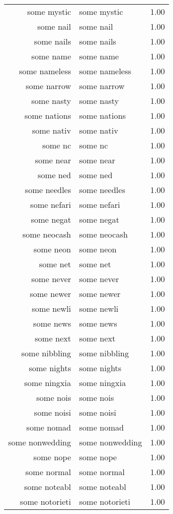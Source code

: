 \begin{table}[ht]
\begin{tabular}{rlr}
  some mystic & some mystic & 1.00 \\ 
  some nail & some nail & 1.00 \\ 
  some nails & some nails & 1.00 \\ 
  some name & some name & 1.00 \\ 
  some nameless & some nameless & 1.00 \\ 
  some narrow & some narrow & 1.00 \\ 
  some nasty & some nasty & 1.00 \\ 
  some nations & some nations & 1.00 \\ 
  some nativ & some nativ & 1.00 \\ 
  some nc & some nc & 1.00 \\ 
  some near & some near & 1.00 \\ 
  some ned & some ned & 1.00 \\ 
  some needles & some needles & 1.00 \\ 
  some nefari & some nefari & 1.00 \\ 
  some negat & some negat & 1.00 \\ 
  some neocash & some neocash & 1.00 \\ 
  some neon & some neon & 1.00 \\ 
  some net & some net & 1.00 \\ 
  some never & some never & 1.00 \\ 
  some newer & some newer & 1.00 \\ 
  some newli & some newli & 1.00 \\ 
  some news & some news & 1.00 \\ 
  some next & some next & 1.00 \\ 
  some nibbling & some nibbling & 1.00 \\ 
  some nights & some nights & 1.00 \\ 
  some ningxia & some ningxia & 1.00 \\ 
  some nois & some nois & 1.00 \\ 
  some noisi & some noisi & 1.00 \\ 
  some nomad & some nomad & 1.00 \\ 
  some nonwedding & some nonwedding & 1.00 \\ 
  some nope & some nope & 1.00 \\ 
  some normal & some normal & 1.00 \\ 
  some noteabl & some noteabl & 1.00 \\ 
  some notorieti & some notorieti & 1.00 \\ 

\end{tabular}
\end{table}
